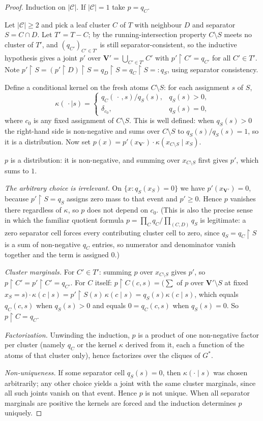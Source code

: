 \documentclass[11pt]{article}
\theoremstyle{definition}
\newcommand{\restr}{\!\restriction\!}
\begin{document}
\begin{proof}
Induction on $|\mathcal C|$. If $|\mathcal C|=1$ take $p=q_C$.

Let $|\mathcal C|\ge2$ and pick a leaf cluster $C$ of $T$ with neighbour $D$ and separator
$S=C\cap D$. Let $T'=T-C$; by the running-intersection property $C\setminus S$ meets no cluster of
$T'$, and $(q_{C'})_{C'\in T'}$ is still separator-consistent, so the inductive hypothesis gives a
joint $p'$ over $\mathbf V'=\bigcup_{C'\in T'}C'$ with $p'\restr C'=q_{C'}$ for all $C'\in T'$. Note
$p'\restr S=(p'\restr D)\restr S=q_D\restr S=q_C\restr S=:q_S$, using separator consistency.

Define a conditional kernel on the fresh atoms $C\setminus S$: for each assignment $s$ of $S$,
\[
  \kappa(\,\cdot\mid s)=
  \begin{cases}
    q_C(\,\cdot\,,s)/q_S(s), & q_S(s)>0,\\
    \delta_{c_0}, & q_S(s)=0,
  \end{cases}
\]
where $c_0$ is any fixed assignment of $C\setminus S$. This is well defined: when $q_S(s)>0$ the
right-hand side is non-negative and sums over $C\setminus S$ to $q_S(s)/q_S(s)=1$, so it is a
distribution. Now set $p(x)=p'(x_{\mathbf V'})\cdot\kappa(x_{C\setminus S}\mid x_S)$.

$p$ is a distribution: it is non-negative, and summing over $x_{C\setminus S}$ first gives $p'$, which
sums to $1$.

\emph{The arbitrary choice is irrelevant.} On $\{x:q_S(x_S)=0\}$ we have $p'(x_{\mathbf V'})=0$,
because $p'\restr S=q_S$ assigns zero mass to that event and $p'\ge0$. Hence $p$ vanishes there
regardless of $\kappa$, so $p$ does not depend on $c_0$. (This is also the precise sense in which the
familiar quotient formula $p=\prod_C q_C/\prod_{(C,D)}q_S$ is legitimate: a zero separator cell forces
every contributing cluster cell to zero, since $q_S=q_C\restr S$ is a sum of non-negative $q_C$
entries, so numerator and denominator vanish together and the term is assigned $0$.)

\emph{Cluster marginals.} For $C'\in T'$: summing $p$ over $x_{C\setminus S}$ gives $p'$, so
$p\restr C'=p'\restr C'=q_{C'}$. For $C$ itself: $p\restr C(c,s)=\bigl(\sum$ of $p$ over
$\mathbf V'\setminus S$ at fixed $x_S=s\bigr)\cdot\kappa(c\mid s)=p'\restr S(s)\,\kappa(c\mid s)
=q_S(s)\kappa(c\mid s)$, which equals $q_C(c,s)$ when $q_S(s)>0$ and equals $0=q_C(c,s)$ when
$q_S(s)=0$. So $p\restr C=q_C$.

\emph{Factorization.} Unwinding the induction, $p$ is a product of one non-negative factor per cluster
(namely $q_C$ or the kernel $\kappa$ derived from it, each a function of the atoms of that cluster
only), hence factorizes over the cliques of $G^\ast$.

\emph{Non-uniqueness.} If some separator cell $q_S(s)=0$, then $\kappa(\cdot\mid s)$ was chosen
arbitrarily; any other choice yields a joint with the same cluster marginals, since all such joints
vanish on that event. Hence $p$ is not unique. When all separator marginals are positive the kernels
are forced and the induction determines $p$ uniquely.
\end{proof}
\end{document}
